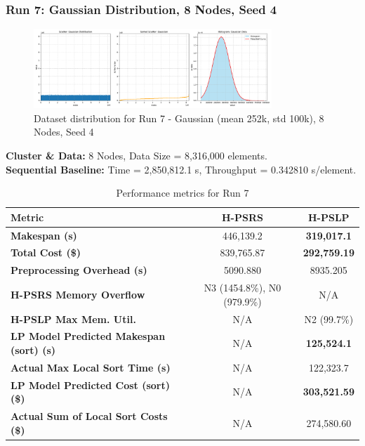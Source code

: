 \documentclass[]{interact}
\theoremstyle{plain}
\theoremstyle{definition}
\theoremstyle{remark}
\begin{document}
\subsubsection{Run 7: Gaussian Distribution, 8 Nodes, Seed 4}

\begin{figure}[H]
    \centering
    \includegraphics[width=0.8\textwidth]{src/out/7run_8node_4seed_gaussian.png}
    \caption{Dataset distribution for Run 7 - Gaussian (mean 252k, std 100k), 8 Nodes, Seed 4}
    \label{fig:run7_dist}
\end{figure}

\textbf{Cluster \& Data:} 8 Nodes, Data Size = 8,316,000 elements.\\
\textbf{Sequential Baseline:} Time = 2,850,812.1 \textmu{}s, Throughput = 0.342810 \textmu{}s/element.

\begin{table}[H]
\centering
\caption{Performance metrics for Run 7}
\label{tab:run7}
\begin{tabular}{@{}lcc@{}}
\toprule
\textbf{Metric} & \textbf{H-PSRS} & \textbf{H-PSLP} \\
\midrule
\textbf{Makespan (\textmu{}s)} & 446,139.2 & \textbf{319,017.1} \\
\textbf{Total Cost (\$)} & 839,765.87 & \textbf{292,759.19} \\
\textbf{Preprocessing Overhead (\textmu{}s)} & 5090.880 & 8935.205 \\
\textbf{H-PSRS Memory Overflow} & N3 (1454.8\%), N0 (979.9\%) & N/A \\
\textbf{H-PSLP Max Mem. Util.} & N/A & N2 (99.7\%) \\
\textbf{LP Model Predicted Makespan (sort) (\textmu{}s)} & N/A & \textbf{125,524.1} \\
\textbf{Actual Max Local Sort Time (\textmu{}s)} & N/A & 122,323.7 \\
\textbf{LP Model Predicted Cost (sort) (\$)} & N/A & \textbf{303,521.59} \\
\textbf{Actual Sum of Local Sort Costs (\$)} & N/A & 274,580.60 \\
\bottomrule
\end{tabular}
\end{table}
\end{document}
